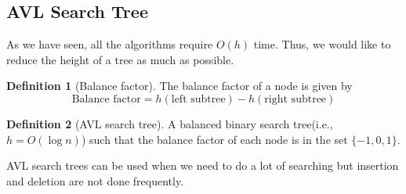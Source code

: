 \documentclass[10pt, a4paper]{extarticle}
\theoremstyle{definition}
\newtheorem{defn}{Definition}
\begin{document}
	\subsection{AVL Search Tree}
	As we have seen, all the algorithms require $O(h)$ time. Thus, we would like to reduce the height of a tree as much as possible.
	\begin{defn}[Balance factor]
		The balance factor of a node is given by
		\[\text{Balance factor}=h(\text{left subtree})-h(\text{right subtree})\]
	\end{defn}
	\begin{defn}[AVL search tree]
		A balanced binary search tree(i.e., $h=O(\log n)$) such that the balance factor of each node is in the set $\{-1,0,1\}$.
	\end{defn}

	AVL search trees can be used when we need to do a lot of searching but insertion and deletion are not done frequently.
\end{document}
